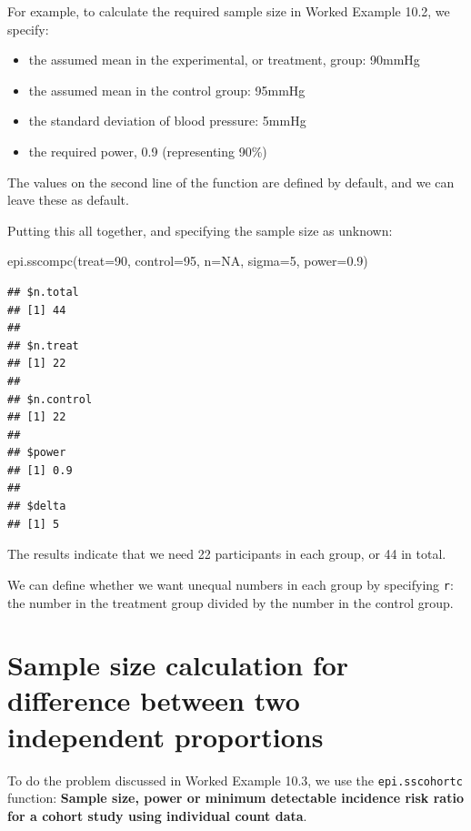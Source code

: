 \documentclass[
]{memoir}
\newenvironment{Shaded}{\begin{snugshade}}{\end{snugshade}}
\newcommand{\AttributeTok}[1]{\textcolor[rgb]{0.77,0.63,0.00}{#1}}
\newcommand{\ConstantTok}[1]{\textcolor[rgb]{0.00,0.00,0.00}{#1}}
\newcommand{\DecValTok}[1]{\textcolor[rgb]{0.00,0.00,0.81}{#1}}
\newcommand{\FloatTok}[1]{\textcolor[rgb]{0.00,0.00,0.81}{#1}}
\newcommand{\FunctionTok}[1]{\textcolor[rgb]{0.00,0.00,0.00}{#1}}
\newcommand{\NormalTok}[1]{#1}
\providecommand{\tightlist}{%
  \setlength{\itemsep}{0pt}\setlength{\parskip}{0pt}}
\begin{document}
For example, to calculate the required sample size in Worked Example 10.2, we specify:

\begin{itemize}
\tightlist
\item
  the assumed mean in the experimental, or treatment, group: 90mmHg
\item
  the assumed mean in the control group: 95mmHg
\item
  the standard deviation of blood pressure: 5mmHg
\item
  the required power, 0.9 (representing 90\%)
\end{itemize}

The values on the second line of the function are defined by default, and we can leave these as default.

Putting this all together, and specifying the sample size as unknown:

\begin{Shaded}
\begin{Highlighting}[]
\FunctionTok{epi.sscompc}\NormalTok{(}\AttributeTok{treat=}\DecValTok{90}\NormalTok{, }\AttributeTok{control=}\DecValTok{95}\NormalTok{, }\AttributeTok{n=}\ConstantTok{NA}\NormalTok{, }\AttributeTok{sigma=}\DecValTok{5}\NormalTok{, }\AttributeTok{power=}\FloatTok{0.9}\NormalTok{) }
\end{Highlighting}
\end{Shaded}

\begin{verbatim}
## $n.total
## [1] 44
## 
## $n.treat
## [1] 22
## 
## $n.control
## [1] 22
## 
## $power
## [1] 0.9
## 
## $delta
## [1] 5
\end{verbatim}

The results indicate that we need 22 participants in each group, or 44 in total.

We can define whether we want unequal numbers in each group by specifying \texttt{r}: the number in the treatment group divided by the number in the control group.

\hypertarget{sample-size-calculation-for-difference-between-two-independent-proportions}{%
\section{Sample size calculation for difference between two independent proportions}\label{sample-size-calculation-for-difference-between-two-independent-proportions}}

To do the problem discussed in Worked Example 10.3, we use the \texttt{epi.sscohortc} function: \textbf{Sample size, power or minimum detectable incidence risk ratio for a cohort study using individual count data}.
\end{document}
